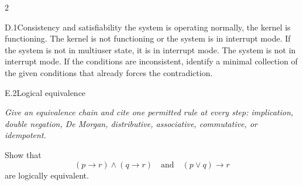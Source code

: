 \documentclass[9pt]{extarticle}
\begin{document}
\begin{multicols}{2}
\begin{CoreProblem}{D.1}{Consistency and satisfiability}
the system is operating normally, the kernel is functioning. The kernel is not
functioning or the system is in interrupt mode. If the system is not in
multiuser state, it is in interrupt mode. The system is not in interrupt mode.
If the conditions are inconsistent, identify a minimal collection of the given
conditions that already forces the contradiction.
\end{CoreProblem}
\begin{CoreProblem}{E.2}{Logical equivalence}
{\scriptsize\textit{Give an equivalence chain and cite one permitted rule at every step: implication, double negation, De Morgan, distributive, associative, commutative, or idempotent.}\par}
Show that
\[
  (p\to r)\land(q\to r)
  \quad\text{and}\quad
  (p\lor q)\to r
\]
are logically equivalent.
\end{CoreProblem}
\end{multicols}
\CoreWorkArea
\FormBreak
{}
\end{document}
